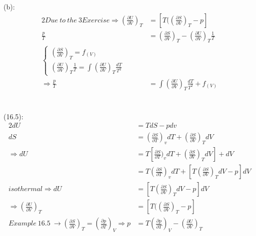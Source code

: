 \begin{latin}
    (b):\
    \begin{alignat*}{2}
        Due\ to\ the\ 3Exercise \Longrightarrow (\frac{\partial U}{\partial V})_T &= [T((\frac{\partial S}{\partial V})_T - p]\\
        \frac{p}{T} &= (\frac{\partial S}{\partial V})_T - (\frac{\partial U}{\partial V})_T \frac{1}{T}\\
        \begin{cases} 
            (\frac{\partial S}{\partial V})_T = f_(V)\\
            (\frac{\partial U}{\partial V})_T \frac{1}{T} = \int(\frac{\partial U}{\partial V})_T \frac{dT}{T^2}
        \end{cases}\\
        \Longrightarrow \frac{p}{T} &= \int(\frac{\partial U}{\partial V})_T \frac{dT}{T^2} + f_(V)
    \end{alignat*}\\\\

    (16.5):\
    \begin{alignat*}{2}
        dU &= TdS - pdv\\
        dS &= (\frac{\partial S}{\partial T})_v dT + (\frac{\partial S}{\partial V})_T dV\\
        \Longrightarrow dU &= T[\frac{\partial S}{\partial T})_v dT + (\frac{\partial S}{\partial V})_T dV] +dV\\
        &=T(\frac{\partial S}{\partial T})_v dT+ [T(\frac{\partial S}{\partial V})_T dV -p]dV\\
        isothermal\Longrightarrow dU&= [T(\frac{\partial S}{\partial V})_T dV -p]dV\\
        \Longrightarrow (\frac{\partial U}{\partial V})_T &= [T((\frac{\partial S}{\partial V})_T - p]\\
        Example\ 16.5\ \to (\frac{\partial S}{\partial V})_T = (\frac{\partial p}{\partial T})_V\Longrightarrow p &= T(\frac{\partial p}{\partial T})_V - (\frac{\partial U}{\partial V})_T \\
    \end{alignat*}\\


\end{latin}
